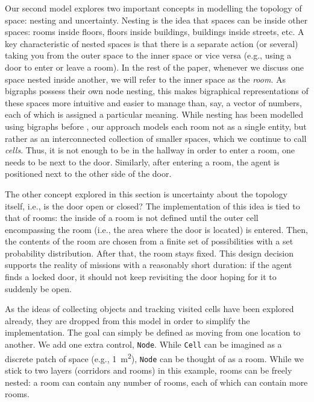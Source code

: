 \documentclass[runningheads]{llncs}
\begin{document}
Our second model explores two important concepts in modelling the topology of
space: nesting and uncertainty. Nesting is the idea that spaces can be inside
other spaces: rooms inside floors, floors inside buildings, buildings inside
streets, etc. A key characteristic of nested spaces is that there is a separate
action (or several) taking you from the outer space to the inner space or vice
versa (e.g., using a door to enter or leave a room). In the rest of the paper,
whenever we discuss one space nested inside another, we will refer to the inner
space as the \emph{room}. As bigraphs possess their own node nesting, this makes
bigraphical representations of these spaces more intuitive and easier to manage
than, say, a vector of numbers, each of which is assigned a particular meaning.
While nesting has been modelled using bigraphs before
\cite{DBLP:conf/giscience/WaltonW12}, our approach models each room not as a
single entity, but rather as an interconnected collection of smaller spaces,
which we continue to call \emph{cells}. Thus, it is not enough to be in the
hallway in order to enter a room, one needs to be next to the door. Similarly,
after entering a room, the agent is positioned next to the other side of the
door.

The other concept explored in this section is uncertainty about the topology
itself, i.e., is the door open or closed? The implementation of this idea is
tied to that of rooms: the inside of a room is not defined until the outer cell
encompassing the room (i.e., the area where the door is located) is entered.
Then, the contents of the room are chosen from a finite set of possibilities
with a set probability distribution. After that, the room stays fixed. This
design decision supports the reality of missions with a reasonably short
duration: if the agent finds a locked door, it should not keep revisiting the
door hoping for it to suddenly be open.

As the ideas of collecting objects and tracking visited cells have been
explored already, they are dropped from this model in order to simplify the
implementation. The goal can simply be defined as moving from one location to
another. We add one extra control, \texttt{Node}. While \texttt{Cell} can be
imagined as a discrete patch of space (e.g., \SI{1}{\square\metre}),
\texttt{Node} can be thought of as a room. While we stick to two layers
(corridors and rooms) in this example, rooms can be freely nested: a room can
contain any number of rooms, each of which can contain more rooms.
\end{document}
